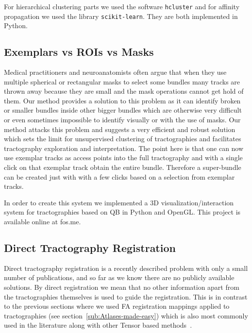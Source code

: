 \documentclass[preprint,authoryear,a4paper,10pt,onecolumn]{elsarticle}
\begin{document}
For hierarchical clustering parts we used the software \texttt{hcluster}
and for affinity propagation we used the library
\texttt{scikit-learn}. They are both implemented in Python.

\subsection{Exemplars vs ROIs vs Masks}

Medical practitioners and neuroanatomists often argue that when they use
multiple spherical or rectangular masks to select some bundles many
tracks are thrown away because they are small and the mask operations
cannot get hold of them. Our method provides a solution to this problem
as it can identify broken or smaller bundles inside other bigger bundles
which are otherwise very difficult or even sometimes impossible to
identify visually or with the use of masks. Our method attacks this
problem and suggests a very efficient and robust solution which sets the
limit for unsupervised clustering of tractographies and facilitates
tractography exploration and interpretation. The point here is that one
can now use exemplar tracks as access points into the full tractography
and with a single click on that exemplar track obtain the entire bundle.
Therefore a super-bundle can be created just with with a few clicks
based on a selection from exemplar tracks.

In order to create this system we implemented a 3D
visualization/interaction system for tractographies based on QB in
Python and OpenGL. This project is available online at fos.me.


\subsection{Direct Tractography Registration}

Direct tractography registration is a recently described problem with
only a small number of publications, and so far as we know there are no
publicly available solutions. By direct registration we mean that no
other information apart from the tractographies themselves is used to
guide the registration. This is in contrast to the previous sections
where we used FA registration mappings applied to tractographies (see
section~\ref{sub:Atlases-made-easy}) which is also most commonly used in
the literature along with other Tensor based
methods~\citep{goh2006algebraic}.
\end{document}
